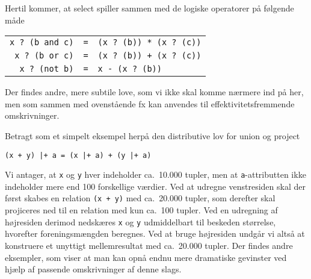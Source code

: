 \documentclass{article}
\newcounter{eks}
\begin{document}
Hertil kommer, at select spiller sammen med de logiske operatorer
p\aa{} f\o{}lgende m\aa{}de
\begin{center}
\begin{tabular}{rcl}
\verb"x ? (b and c)" & \verb"=" & \verb"(x ? (b)) * (x ? (c))"\\
\verb"x ? (b or c)" & \verb"=" & \verb"(x ? (b)) + (x ? (c))"\\
\verb"x ? (not b)" & \verb"=" & \verb"x - (x ? (b))"
\end{tabular}
\end{center}
Der findes andre, mere subtile love, som vi ikke skal komme n\ae{}rmere
ind p\aa{} her, men som sammen med ovenst\aa{}ende fx kan anvendes til
effektivitetsfremmende omskrivninger.

Betragt som et simpelt eksempel herp\aa{} den distributive lov for
union og project
\begin{center}
\verb"(x + y) |+ a = (x |+ a) + (y |+ a)"
\end{center}
Vi antager, at \verb"x" og \verb"y" hver indeholder ca.\ 10.000 tupler,
men at \verb"a"-attribut\-ten ikke indeholder mere end 100 forskellige
v\ae{}rdier. Ved at udregne venstresiden skal der f\o{}rst skabes en
relation \verb"(x + y)" med ca.\ 20.000 tupler, som derefter
skal projiceres ned til en relation med kun ca.\ 100 tupler.
Ved en udregning af h\o{}jresiden derimod nedsk\ae{}res \verb"x" og
\verb"y" udmiddelbart til beskeden st\o{}rrelse, hvorefter
foreningsm\ae{}ngden beregnes. Ved at bruge h\o{}jresiden undg\aa{}r
vi alts\aa{} at konstruere et unyttigt mellemresultat med ca.\
20.000 tupler. Der findes andre eksempler, som viser at man kan opn\aa{}
endnu mere dramatiske gevinster ved hj\ae{}lp af passende omskrivninger
af denne slags.
\end{document}
